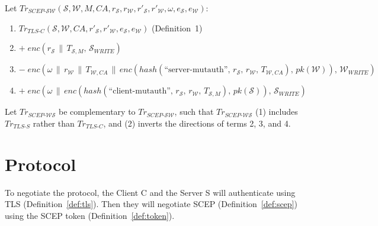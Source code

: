 \documentclass[12pt]{article}
\newcommand{\concat}{\,\|\,}
\newcommand{\enc}[2]{enc(#1,\,#2)}
\newcommand{\hash}[1]{hash(#1)}
\newcommand{\pk}[1]{\mathit{pk}(#1)}
\begin{document}
Let $\mathit{Tr}_{\mathit{SCEP\text{-}\mathcal{SW}}}(\mathcal{S}, \mathcal{W}, M, CA,
r_\mathcal{S}, r_\mathcal{W}, r'_\mathcal{S}, r'_\mathcal{W}, \omega,
e_\mathcal{S}, e_\mathcal{W})$:

\begin{enumerate}[label=\arabic*.]
  \item $\mathit{Tr}_{\mathit{TLS\text{-}C}}(\mathcal{S}, \mathcal{W}, CA,
    r'_\mathcal{S}, r'_\mathcal{W}, e_\mathcal{S}, e_\mathcal{W})$
    \hfill (Definition~1)

  \item $+\; \enc{r_\mathcal{S} \concat T_{\mathcal{S},M}}{\mathcal{S}_{\mathit{WRITE}}}$

  \item $-\; \enc{%
    \omega \concat r_\mathcal{W} \concat T_{\mathcal{W},CA}
    \concat \enc{\hash{\text{``server-mutauth''},\, r_\mathcal{S},\, r_\mathcal{W},\,
      T_{\mathcal{W},CA}}}{\pk{\mathcal{W}}}%
  }{\mathcal{W}_{\mathit{WRITE}}}$

  \item $+\; \enc{%
    \omega \concat
    \enc{\hash{\text{``client-mutauth''},\, r_\mathcal{S},\, r_\mathcal{W},\,
      T_{\mathcal{S},M}}}{\pk{\mathcal{S}}}%
  }{\mathcal{S}_{\mathit{WRITE}}}$
\end{enumerate}

Let $\mathit{Tr}_{\mathit{SCEP\text{-}\mathcal{WS}}}$ be complementary to
$\mathit{Tr}_{\mathit{SCEP\text{-}\mathcal{SW}}}$, such that
$\mathit{Tr}_{\mathit{SCEP\text{-}\mathcal{WS}}}$
(1) includes $\mathit{Tr}_{\mathit{TLS\text{-}S}}$ rather than
$\mathit{Tr}_{\mathit{TLS\text{-}C}}$, and
(2) inverts the directions of terms 2, 3, and 4.

\section{Protocol}
To negotiate the protocol, the Client C and the Server S will authenticate using TLS (Definition~\ref{def:tls}).
Then they will negotiate SCEP (Definition~\ref{def:scep}) using the SCEP token (Definition~\ref{def:token}).
\end{document}
